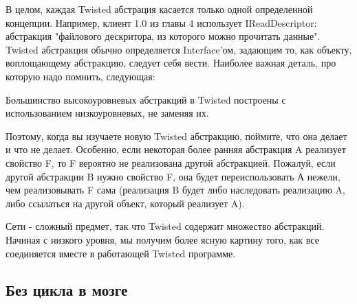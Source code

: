 В целом, каждая Twisted абстрация касается только 
одной определенной концепции. Например, клиент 1.0 из 
главы 4 использует IReadDescriptor: абстракция 
"файлового дескритора, из которого можно прочитать данные". 
Twisted абстракция обычно определяется Interface'ом, 
задающим то, как объекту, воплощающему абстракцию, 
следует себя вести. Наиболее важная деталь, про которую надо 
помнить, следующая:

Большинство высокоуровневых абстракций в Twisted построены 
с использованием низкоуровневых, не заменяя их.



Поэтому, когда вы изучаете новую Twisted абстракцию, 
поймите, что она делает и что не делает. Особенно, если 
некоторая более ранняя абстракция A реализует свойство F, 
то F вероятно не реализована другой абстракцией. 
Пожалуй, если другой абстракции B нужно свойство F, 
она будет переиспользовать А нежели, чем реализовывать F 
сама (реализация B будет либо наследовать реализацию 
A, либо ссылаться на другой объект, который реализует A). 


Сети - сложный предмет, так что Twisted содержит множество 
абстракций. Начиная с низкого уровня, мы получим 
более ясную картину того, как все соединяется вместе в 
работающей Twisted программе.


\subsection{Без цикла в мозге}


